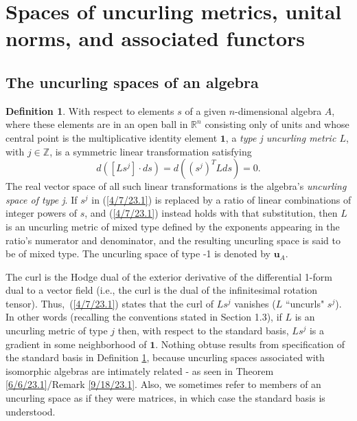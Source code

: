 \documentclass{amsart}
\numberwithin{equation}{section}
\theoremstyle{definition}
\newtheorem{definition}[theorem]{Definition}
\numberwithin{theorem}{section}
\begin{document}
 

 \section{Spaces of uncurling metrics, unital norms, and associated  functors}  
      \subsection{The uncurling spaces of an algebra}  
         \begin{definition}\label{7/21/23.1} With respect to elements $s$ of a given $n$-dimensional algebra $A$, where these elements are in an open ball in $\mathbb{R}^n$ consisting only of units and whose central point is the multiplicative identity element $\mathbf{1}$, a  {\it type j uncurling metric $L$}, with $j\in \mathbb{Z}$, is a symmetric linear transformation  satisfying \begin{equation}\label{4/7/23.1} d([Ls^j]\cdot ds) = d\left((s^j)^T L ds\right) = 0. \end{equation}  The real vector space of all such linear transformations is the algebra's {\it uncurling space of type j}.  If $s^j$ in (\ref{4/7/23.1}) is replaced by a ratio of linear combinations of integer powers of $s$, and (\ref{4/7/23.1}) instead holds with that substitution, then $L$ is an uncurling metric of mixed type defined by the exponents appearing in the ratio's numerator and denominator, and the resulting uncurling space is said to be of mixed type.   The uncurling space of type -1 is denoted by $\mathbf{u}_A$.   \end{definition}


 The curl is the Hodge dual of the exterior derivative of the differential \mbox{1-form} dual to a vector field (i.e., the curl is the dual of the infinitesimal rotation tensor).  \mbox{Thus,  (\ref{4/7/23.1})} states that the curl of $Ls^j$ vanishes ($L$ ``uncurls" $s^j$).    In other words (recalling the conventions stated in Section 1.3), if $L$ is an uncurling metric of type $j$ then, with respect to the standard basis, $Ls^j$ is a gradient in some neighborhood of $\mathbf{1}$.   Nothing obtuse results from specification of the standard basis in Definition \ref{7/21/23.1}, because uncurling spaces associated with isomorphic algebras are intimately related - as seen in Theorem \ref{6/6/23.1}/Remark \ref{9/18/23.1}.  Also, we sometimes refer to members of an uncurling space as if they were matrices, in which case the standard basis is understood.
  
\end{document}
